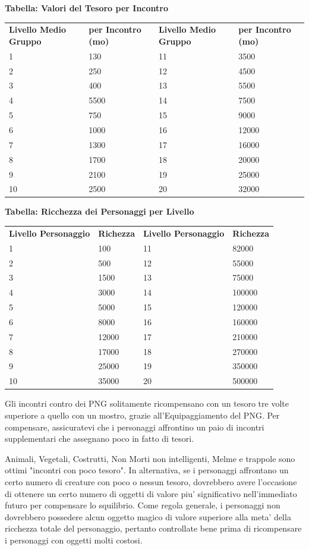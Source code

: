 \documentclass[a4paper,11pt,twoside,openany]{book}
\begin{document}
\bigskip

\textbf{Tabella: Valori del Tesoro per Incontro}

\begin{tabular}{llll}
\toprule
\textbf{Livello Medio Gruppo} & \textbf{per Incontro (mo)} & \textbf{Livello Medio Gruppo} & \textbf{per Incontro (mo)}\tabularnewline
1 & 130 & 11 & 3500\tabularnewline
2 & 250 & 12 & 4500\tabularnewline
3 & 400 & 13 & 5500\tabularnewline
4 & 5500 & 14 & 7500\tabularnewline
5 & 750 & 15 & 9000\tabularnewline
6 & 1000 & 16 & 12000\tabularnewline
7 & 1300 & 17 & 16000\tabularnewline
8 & 1700 & 18 & 20000\tabularnewline
9 & 2100 & 19 & 25000\tabularnewline
10 & 2500 & 20 & 32000\tabularnewline
\end{tabular}
\bigskip

\textbf{Tabella: Ricchezza dei Personaggi per Livello}

\bigskip

\begin{tabular}{llll}
\toprule
\textbf{Livello Personaggio} & \textbf{Richezza} &\textbf{ Livello Personaggio} & \textbf{Richezza}\tabularnewline
1 & 100 & 11 & 82000\tabularnewline
2 & 500 & 12 & 55000\tabularnewline
3 & 1500 & 13 & 75000\tabularnewline
4 & 3000 & 14 & 100000\tabularnewline
5 & 5000 & 15 & 120000\tabularnewline
6 & 8000 & 16 & 160000\tabularnewline
7 & 12000 & 17 & 210000\tabularnewline
8 & 17000 & 18 & 270000\tabularnewline
9 & 25000 & 19 & 350000\tabularnewline
10 & 35000 & 20 & 500000\tabularnewline
\end{tabular}

\bigskip

Gli incontri contro dei PNG solitamente ricompensano con un tesoro
tre volte superiore a quello con un mostro, grazie all'Equipaggiamento
del PNG. Per compensare, assicuratevi che i personaggi affrontino
un paio di incontri supplementari che assegnano poco in fatto di tesori.

Animali, Vegetali, Costrutti, Non Morti non intelligenti, Melme e trappole sono ottimi "incontri con poco tesoro". In alternativa, se i personaggi affrontano un certo numero di creature con poco o nessun tesoro, dovrebbero avere l'occasione di ottenere un certo numero di oggetti di valore piu' significativo nell'immediato futuro per compensare lo squilibrio. Come regola generale, i personaggi non dovrebbero possedere alcun oggetto magico di valore superiore alla meta' della ricchezza totale del personaggio, pertanto controllate bene prima di ricompensare i personaggi con oggetti molti costosi.
\end{document}
